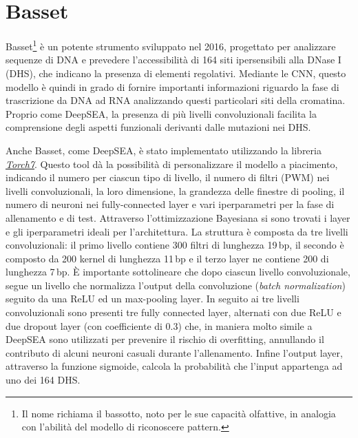 \begin{comment}
Ogni training sample consisteva nel 1000\,bp sequences, centrata sul frammento (bin) di 200 basi ed associata al vettore di etichette che ontiene le 919 features. In questo modo, le due sequenze di 400 \,bp ai lati davaano più contesto in modo da interpretare meglio il risultato.

\end{comment}






\section{Basset}\label{sec:Basset}
% 
Basset\footnote{Il nome richiama il bassotto, noto per le sue capacità olfattive, in analogia con l'abilità del modello di riconoscere pattern.} è un potente strumento sviluppato nel 2016, progettato per analizzare sequenze di DNA e prevedere l'accessibilità di 164 siti ipersensibili alla DNase I (\acs{DHS}), che indicano la presenza di elementi regolativi. Mediante le \acs{CNN}, questo modello è quindi in grado di fornire importanti informazioni riguardo la fase di trascrizione da \acs{DNA} ad \acs{RNA} analizzando questi particolari siti della cromatina. Proprio come DeepSEA, la presenza di più livelli convoluzionali facilita la comprensione degli aspetti funzionali derivanti dalle mutazioni nei \acs{DHS}.

Anche Basset, come DeepSEA, è stato implementato utilizzando la libreria \href{https://github.com/torch/torch7}{\textsl{Torch7}}. Questo tool dà la possibilità di personalizzare il modello a piacimento, indicando il numero per ciascun tipo di livello, il numero di filtri (\acs{PWM}) nei livelli convoluzionali, la loro dimensione, la grandezza delle finestre di pooling, il numero di neuroni nei fully-connected layer e vari iperparametri per la fase di allenamento e di test. Attraverso l'ottimizzazione Bayesiana si sono trovati i layer e gli iperparametri ideali per l'architettura. La struttura è composta da tre livelli convoluzionali: il primo livello contiene 300 filtri di lunghezza 19\,bp, il secondo è composto da 200 kernel di lunghezza 11\,bp e il terzo layer ne contiene 200 di lunghezza 7\,bp. È importante sottolineare che dopo ciascun livello convoluzionale, segue un livello che normalizza l'output della convoluzione (\textit{batch normalization}) seguito da una \acs{ReLU} ed un max-pooling layer. In seguito ai tre livelli convoluzionali sono presenti tre fully connected layer, alternati con due \acs{ReLU} e due dropout layer (con coefficiente di 0.3) che, in maniera molto simile a DeepSEA sono utilizzati per prevenire il rischio di overfitting, annullando il contributo di alcuni neuroni casuali durante l'allenamento. Infine l'output layer, attraverso la funzione sigmoide, calcola la probabilità che l'input appartenga ad uno dei 164 \acs{DHS}.

